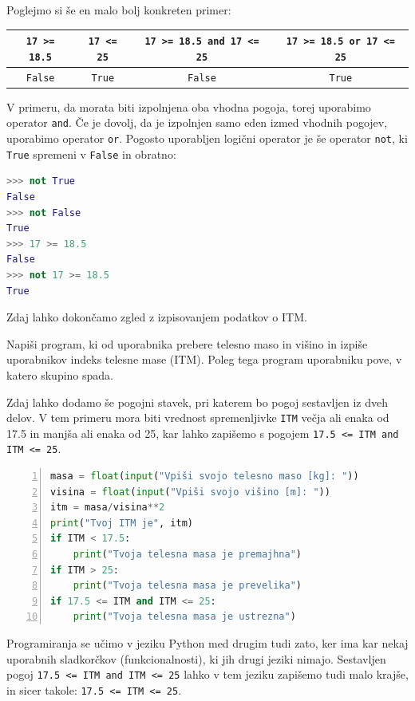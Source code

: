 \bigskip

Poglejmo si še en malo bolj konkreten primer:

\begin{tabular}{cc|cc}
     \texttt{17 >= 18.5} & \texttt{17 <= 25}  & \texttt{17 >= 18.5 and 17 <= 25} & \texttt{17 >= 18.5 or 17 <= 25}\\
     \hline
     \texttt{False} & \texttt{True} & \texttt{False} & \texttt{True} \\
\end{tabular}

\bigskip

V primeru, da morata biti izpolnjena oba vhodna pogoja, torej uporabimo operator \texttt{and}. Če je dovolj, da je izpolnjen samo eden izmed vhodnih pogojev, uporabimo operator \texttt{or}. Pogosto uporabljen logični operator je še operator \texttt{not}, ki \texttt{True} spremeni v \texttt{False} in obratno:
\begin{lstlisting}[language=Python]
>>> not True
False
>>> not False
True
>>> 17 >= 18.5
False
>>> not 17 >= 18.5
True
\end{lstlisting}

Zdaj lahko dokončamo zgled z izpisovanjem podatkov o ITM.
\begin{zgled}
Napiši program, ki od uporabnika prebere telesno maso in višino in izpiše uporabnikov indeks telesne mase (ITM). Poleg tega program uporabniku pove, v katero skupino spada. 
\end{zgled}
\begin{resitev}
Zdaj lahko dodamo še pogojni stavek, pri katerem bo pogoj sestavljen iz dveh delov. V tem primeru mora biti vrednost spremenljivke \texttt{ITM} večja ali enaka od 17.5 in manjša ali enaka od 25, kar lahko zapišemo s pogojem \texttt{17.5 <= ITM and ITM <= 25}.
\begin{lstlisting}[language=Python,numbers=left]
masa = float(input("Vpiši svojo telesno maso [kg]: "))
visina = float(input("Vpiši svojo višino [m]: "))
itm = masa/visina**2
print("Tvoj ITM je", itm)
if ITM < 17.5:
    print("Tvoja telesna masa je premajhna")
if ITM > 25:
    print("Tvoja telesna masa je prevelika")
if 17.5 <= ITM and ITM <= 25:
    print("Tvoja telesna masa je ustrezna")
\end{lstlisting}
\end{resitev}

Programiranja se učimo v jeziku Python med drugim tudi zato, ker ima kar nekaj uporabnih sladkorčkov (funkcionalnosti), ki jih drugi jeziki nimajo. Sestavljen pogoj \texttt{17.5 <= ITM and ITM <= 25} lahko v tem jeziku zapišemo tudi malo krajše, in sicer takole: \texttt{17.5 <= ITM <= 25}.

